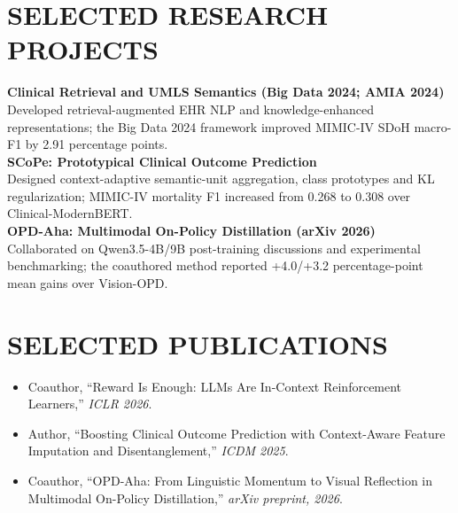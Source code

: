 \documentclass[10pt, letterpaper]{article}
\begin{document}
\section{SELECTED RESEARCH PROJECTS}
\textbf{Clinical Retrieval and UMLS Semantics (Big Data 2024; AMIA 2024)}\\[-1pt]
Developed retrieval-augmented EHR NLP and knowledge-enhanced representations; the Big Data 2024 framework improved MIMIC-IV SDoH macro-F1 by 2.91 percentage points.\\[3pt]
\textbf{SCoPe: Prototypical Clinical Outcome Prediction}\\[-1pt]
Designed context-adaptive semantic-unit aggregation, class prototypes and KL regularization; MIMIC-IV mortality F1 increased from 0.268 to 0.308 over Clinical-ModernBERT.\\[3pt]
\textbf{OPD-Aha: Multimodal On-Policy Distillation (arXiv 2026)}\\[-1pt]
Collaborated on Qwen3.5-4B/9B post-training discussions and experimental benchmarking; the coauthored method reported +4.0/+3.2 percentage-point mean gains over Vision-OPD.\\[3pt]
\section{SELECTED PUBLICATIONS}
\begin{itemize}
\item Coauthor, ``Reward Is Enough: LLMs Are In-Context Reinforcement Learners,'' \textit{ICLR 2026}.
\item Author, ``Boosting Clinical Outcome Prediction with Context-Aware Feature Imputation and Disentanglement,'' \textit{ICDM 2025}.
\item Coauthor, ``OPD-Aha: From Linguistic Momentum to Visual Reflection in Multimodal On-Policy Distillation,'' \textit{arXiv preprint, 2026}.
\end{itemize}
\end{document}
